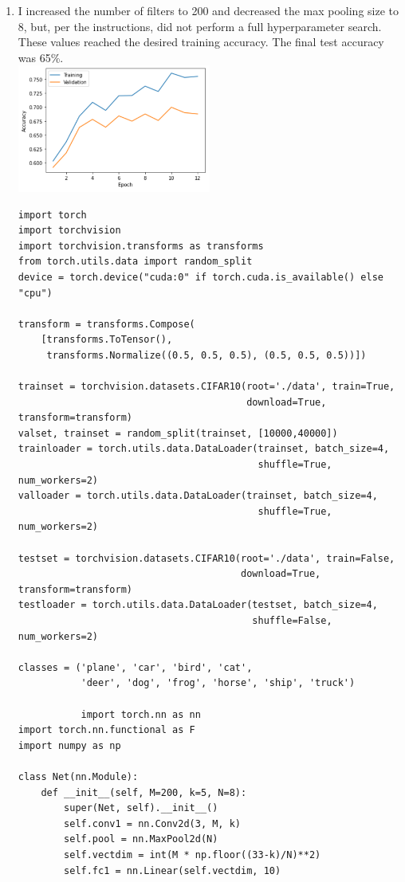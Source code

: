 \documentclass{article}
\begin{document}
\begin{enumerate}
        \newpage
        \item I increased the number of filters to 200 and decreased the max pooling size to 8, but, per the instructions, did not perform a full hyperparameter search.
        These values reached the desired training accuracy. 
        The final test accuracy was 65\%. \\
        \includegraphics[width=0.5\textwidth]{code/A4c.png}
        \begin{verbatim}
import torch
import torchvision
import torchvision.transforms as transforms
from torch.utils.data import random_split
device = torch.device("cuda:0" if torch.cuda.is_available() else "cpu")

transform = transforms.Compose(
    [transforms.ToTensor(),
     transforms.Normalize((0.5, 0.5, 0.5), (0.5, 0.5, 0.5))])

trainset = torchvision.datasets.CIFAR10(root='./data', train=True,
                                        download=True, transform=transform)
valset, trainset = random_split(trainset, [10000,40000])
trainloader = torch.utils.data.DataLoader(trainset, batch_size=4,
                                          shuffle=True, num_workers=2)
valloader = torch.utils.data.DataLoader(trainset, batch_size=4,
                                          shuffle=True, num_workers=2)

testset = torchvision.datasets.CIFAR10(root='./data', train=False,
                                       download=True, transform=transform)
testloader = torch.utils.data.DataLoader(testset, batch_size=4,
                                         shuffle=False, num_workers=2)

classes = ('plane', 'car', 'bird', 'cat',
           'deer', 'dog', 'frog', 'horse', 'ship', 'truck')

           import torch.nn as nn
import torch.nn.functional as F
import numpy as np

class Net(nn.Module):
    def __init__(self, M=200, k=5, N=8):
        super(Net, self).__init__()
        self.conv1 = nn.Conv2d(3, M, k)
        self.pool = nn.MaxPool2d(N)
        self.vectdim = int(M * np.floor((33-k)/N)**2)
        self.fc1 = nn.Linear(self.vectdim, 10)


\end{verbatim}
\end{enumerate}
\end{document}
